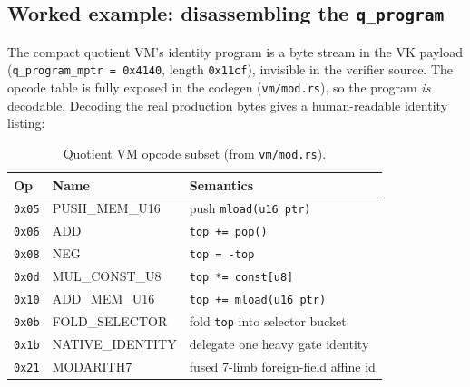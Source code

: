 \subsection{Worked example: disassembling the \texttt{q\_program}}
\label{sec:pr-vm-disasm}

The compact quotient VM's identity program is a byte stream in the VK
payload (\texttt{q\_\allowbreak{}program\_\allowbreak{}mptr = 0x4140}, length \texttt{0x11cf}),
invisible in the verifier source. The opcode table is fully exposed in
the codegen (\texttt{vm/mod.rs}), so the program \emph{is} decodable.
Decoding the real production bytes gives a human-readable identity
listing:

\begin{table}[h]
\centering\footnotesize
\begin{tabular}{@{}llp{9.5em}@{}}
\toprule
\textbf{Op} & \textbf{Name} & \textbf{Semantics} \\
\midrule
\texttt{0x05} & PUSH\_MEM\_U16   & push \texttt{mload(u16 ptr)} \\
\texttt{0x06} & ADD              & \texttt{top += pop()} \\
\texttt{0x08} & NEG              & \texttt{top = -top} \\
\texttt{0x0d} & MUL\_CONST\_U8   & \texttt{top *= const[u8]} \\
\texttt{0x10} & ADD\_MEM\_U16    & \texttt{top += mload(u16 ptr)} \\
\texttt{0x0b} & FOLD\_SELECTOR   & fold \texttt{top} into selector bucket \\
\texttt{0x1b} & NATIVE\_IDENTITY & delegate one heavy gate identity \\
\texttt{0x21} & MODARITH7        & fused 7-limb foreign-field affine id \\
\bottomrule
\end{tabular}
\caption{Quotient VM opcode subset (from \texttt{vm/mod.rs}).}
\end{table}

